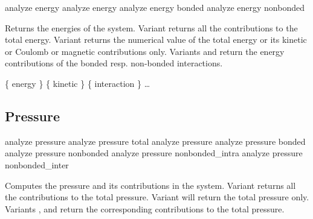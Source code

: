\begin{essyntax}
   analyze energy
   analyze energy 
   analyze energy bonded 
   analyze energy nonbonded  
\end{essyntax}
Returns the energies of the system. Variant  returns all
the contributions to the total energy. Variant  returns the
numerical value of the total energy or its kinetic or Coulomb or magnetic
contributions only. Variants  and  return the
energy contributions of the bonded resp. non-bonded interactions.

\begin{code}
\{ energy  \} \{ kinetic  \} \{ interaction  \} \dots 
\end{code}


\subsection{Pressure}
\label{analyze:pressure}

\begin{essyntax}
   analyze pressure
   analyze pressure total
   analyze pressure 
   analyze pressure bonded 
   analyze pressure nonbonded  
   analyze pressure nonbonded_intra 
   analyze pressure nonbonded_inter 
\end{essyntax}

Computes the pressure and its contributions in the system. Variant
 returns all the contributions to the total pressure.
Variant  will return the total pressure only.  Variants
,  and  return the corresponding
contributions to the total pressure.



